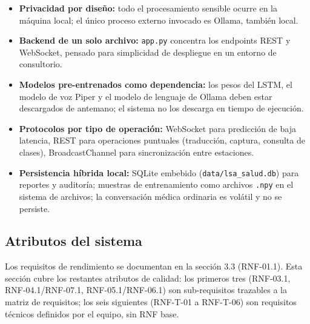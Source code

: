 \begin{itemize}
    \item \textbf{Privacidad por diseño:} todo el procesamiento sensible ocurre en la máquina local; el único proceso externo invocado es Ollama, también local.
    \item \textbf{Backend de un solo archivo:} \texttt{app.py} concentra los endpoints REST y WebSocket, pensado para simplicidad de despliegue en un entorno de consultorio.
    \item \textbf{Modelos pre-entrenados como dependencia:} los pesos del LSTM, el modelo de voz Piper y el modelo de lenguaje de Ollama deben estar descargados de antemano; el sistema no los descarga en tiempo de ejecución.
    \item \textbf{Protocolos por tipo de operación:} WebSocket para predicción de baja latencia, REST para operaciones puntuales (traducción, captura, consulta de clases), BroadcastChannel para sincronización entre estaciones.
    \item \textbf{Persistencia híbrida local:} SQLite embebido (\texttt{data/lsa\_salud.db}) para reportes y auditoría; muestras de entrenamiento como archivos \texttt{.npy} en el sistema de archivos; la conversación médica ordinaria es volátil y no se persiste.
\end{itemize}

\subsection{Atributos del sistema}

Los requisitos de rendimiento se documentan en la sección 3.3 (RNF-01.1).
Esta sección cubre los restantes atributos de calidad: los primeros tres
(RNF-03.1, RNF-04.1/RNF-07.1, RNF-05.1/RNF-06.1) son sub-requisitos
trazables a la matriz de requisitos; los seis siguientes (RNF-T-01 a
RNF-T-06) son requisitos técnicos definidos por el equipo, sin RNF base.

